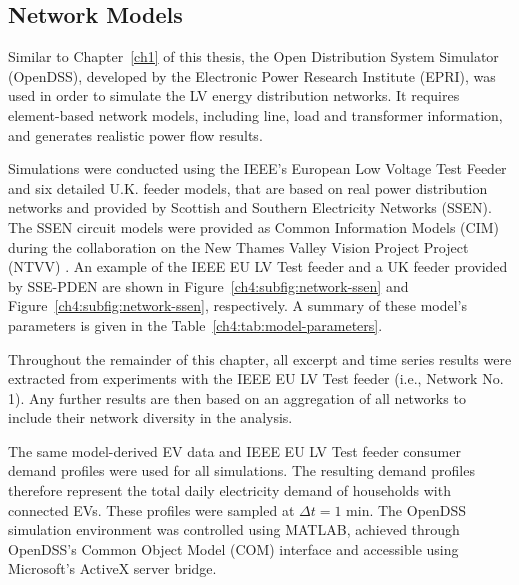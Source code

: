 



\subsection{Network Models}
\label{ch4:subsec:network-models}

Similar to Chapter~\ref{ch1} of this thesis, the Open Distribution System Simulator (OpenDSS), developed by the Electronic Power Research Institute (EPRI), was used in order to simulate the LV energy distribution networks.
It requires element-based network models, including line, load and transformer information, and generates realistic power flow results.



Simulations were conducted using the IEEE's European Low Voltage Test Feeder \cite{EULVFeeder2015} and six detailed U.K. feeder models, that are based on real power distribution networks and provided by Scottish and Southern Electricity Networks (SSEN).
The SSEN circuit models were provided as Common Information Models (CIM) during the collaboration on the New Thames Valley Vision Project Project (NTVV) \cite{NTVV2016}.
An example of the IEEE EU LV Test feeder and a UK feeder provided by SSE-PDEN are shown in Figure~\ref{ch4:subfig:network-ssen} and Figure~\ref{ch4:subfig:network-ssen}, respectively.
A summary of these model's parameters is given in the Table~\ref{ch4:tab:model-parameters}.




Throughout the remainder of this chapter, all excerpt and time series results were extracted from experiments with the IEEE EU LV Test feeder (i.e., Network No. 1).
Any further results are then based on an aggregation of all networks to include their network diversity in the analysis.

The same model-derived EV data and IEEE EU LV Test feeder consumer demand profiles were used for all simulations.
The resulting demand profiles therefore represent the total daily electricity demand of households with connected EVs.
These profiles were sampled at $\Delta t = 1\text{ min}$.
The OpenDSS simulation environment was controlled using MATLAB, achieved through OpenDSS's Common Object Model (COM) interface and accessible using Microsoft's ActiveX server bridge.


